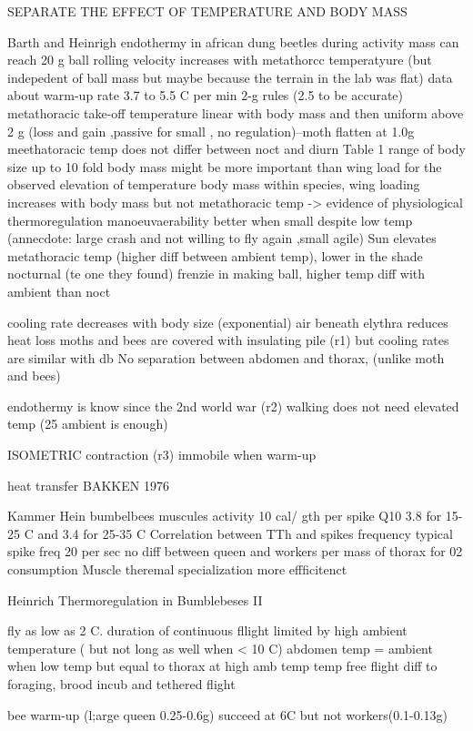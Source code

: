 SEPARATE THE EFFECT OF TEMPERATURE AND BODY MASS

Barth and Heinrigh endothermy in african dung beetles during activity
mass can reach 20 g
ball rolling velocity increases with metathorcc temperatyure (but indepedent of ball mass but maybe because the terrain in the lab was flat)
data about warm-up rate 3.7 to 5.5 C per min
2-g rules (2.5 to be accurate) metathoracic take-off temperature linear with body mass and then uniform above 2 g (loss and gain ,passive for small , no regulation)--moth flatten at 1.0g
meethatoracic temp does not differ between noct and diurn
Table 1 range of body size up to 10 fold 
body mass might be more important than wing load for the observed elevation of temperature body mass
within species, wing loading increases with body mass but not metathoracic temp -> evidence of physiological thermoregulation
manoeuvaerability better when small despite low temp (annecdote: large crash and not willing to fly again ,small agile)
Sun elevates metathoracic temp (higher diff between ambient temp), lower in the shade 
nocturnal (te one they found)  frenzie in making ball, higher temp diff with ambient than noct

cooling rate decreases with body size (exponential) air beneath elythra reduces heat loss  
moths and bees are covered with insulating pile (r1) but cooling rates are similar with db
No separation between abdomen and thorax, (unlike moth and bees)

endothermy is know since the 2nd world war (r2)
walking does not need elevated temp (25 ambient is enough)

ISOMETRIC contraction (r3) immobile when warm-up

heat transfer BAKKEN 1976

Kammer Hein bumbelbees muscules activity
10 cal/ gth per spike
Q10 3.8 for 15-25 C and 3.4 for 25-35 C
Correlation between TTh and  spikes frequency
typical spike freq 20 per sec
no diff between queen and workers per mass of thorax for 02 consumption
Muscle theremal specialization more effficitenct

 Heinrich Thermoregulation in Bumblebeses II
 
fly as low as 2 C. 
duration of continuous fllight limited by high ambient temperature ( but not long as well when < 10 C)
abdomen temp = ambient when low temp but equal to thorax at high amb temp
temp free flight diff to foraging, brood incub and tethered flight

bee warm-up (l;arge queen 0.25-0.6g) succeed at 6C but not workers(0.1-0.13g)

